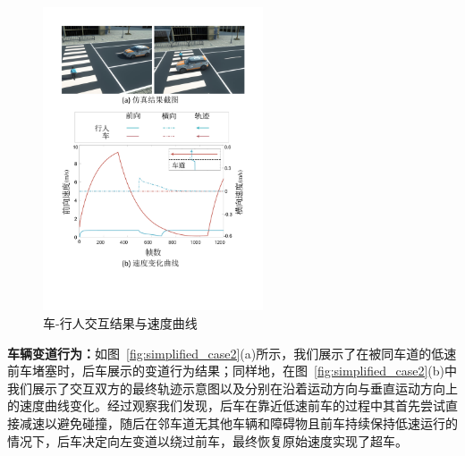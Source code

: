 \begin{figure}[!tbh]
\centering
\includegraphics[width=0.58\textwidth]{figure/simplified/simplified_case1_vert_cn v2.pdf}
\caption[车-行人交互结果与速度曲线]{车-行人交互结果与速度曲线}
\label{fig:simplified_case1}
\end{figure}

\textbf{车辆变道行为：}如图~\ref{fig:simplified_case2}(a)所示，我们展示了在被同车道的低速前车堵塞时，后车展示的变道行为结果；同样地，在图~\ref{fig:simplified_case2}(b)中我们展示了交互双方的最终轨迹示意图以及分别在沿着运动方向与垂直运动方向上的速度曲线变化。经过观察我们发现，后车在靠近低速前车的过程中其首先尝试直接减速以避免碰撞，随后在邻车道无其他车辆和障碍物且前车持续保持低速运行的情况下，后车决定向左变道以绕过前车，最终恢复原始速度实现了超车。

